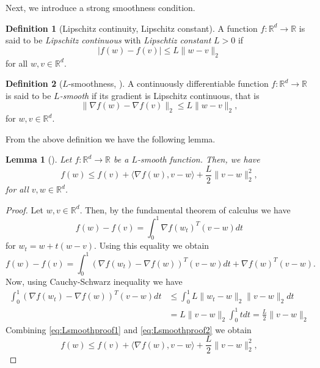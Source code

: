 \documentclass[12pt]{article}
\newtheorem{lemma}[lemma]{Lemma}
\theoremstyle{definition}
\newtheorem{definition}[definition]{Definition}
\numberwithin{equation}{section}
\newcommand{\R}{\mathbb{R}}
\newcommand{\norm}[1]{\lVert{#1}\rVert_2}
\begin{document}
Next, we introduce a strong smoothness condition.
\begin{definition}[Lipschitz continuity, Lipschitz constant]
  \label{def:lipschitz_continuity}
  A function $f : \R^d \rightarrow \R$ is said to be \emph{Lipschitz continuous} with \emph{Lipschtiz constant} $L >0$ if
  \begin{equation*}
    |f(w) - f(v)| \leq L \norm{w - v}
  \end{equation*}
  for all $w,v \in \R^d$.
\end{definition}
\begin{definition}[$L$-smoothness, ]
  \label{def:l_smooth}
  A continuously differentiable function $f : \mathbb{R}^d \rightarrow \mathbb{R}$ is said to be \emph{$L$-smooth} if its gradient is Lipschitz continuous, that is 
  \begin{equation}
    \norm{\nabla f(w) - \nabla f(v) } \leq L \norm{w-v},
  \end{equation}
  for $w,v \in \mathbb{R}^d$.
\end{definition}
From the above definition we have the following lemma.
\begin{lemma}[]
  Let $f : \mathbb{R}^d \rightarrow \mathbb{R}$ be a $L$-smooth function. Then, we have 
  \begin{equation}
    f(w) \leq f(v) + \langle \nabla f(w), v - w \rangle + \frac{L}{2} \norm{ v - w }^2,
  \end{equation}
  for all $v, w \in \mathbb{R}^d$.
\end{lemma}
\begin{proof}
  Let $w, v \in \mathbb{R}^d$. Then, by the fundamental theorem of calculus we have
  $$
  f(w) - f(v) = \int_0^1 \nabla f(w_t)^T(v-w)dt 
  $$
  for $w_t = w + t(w-v)$.
  Using this equality we obtain
  \begin{equation}
    \label{eq:Lsmoothproof1}
    f(w) - f(v) = \int_0^1 (\nabla f(w_t) - \nabla f(w))^T(v-w)dt + \nabla f(w)^T(v-w).
  \end{equation}
  Now, using Cauchy-Schwarz inequality we have
  \begin{align}
    \label{eq:Lsmoothproof2}
    \int_0^1 (\nabla f(w_t) - \nabla f(w))^T(v-w)dt &\leq \int_0^1 L \norm{w_t-w} \norm{v-w}dt \\
    &= L \norm{v-w} \int_0^1 t dt = \frac{L}{2} \norm{v-w}
  \end{align}
  Combining \eqref{eq:Lsmoothproof1} and \eqref{eq:Lsmoothproof2} we obtain
  \begin{equation*}
    f(w) \leq f(v) + \langle \nabla f(w), v - w \rangle + \frac{L}{2} \norm{v - w}^2,
  \end{equation*}
\end{proof}
\end{document}
